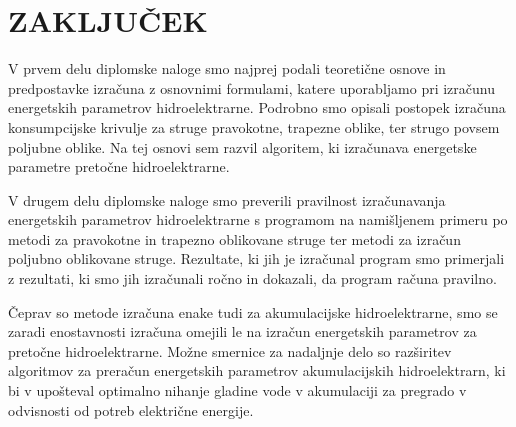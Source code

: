 
\chapter{ZAKLJUČEK}

V prvem delu diplomske naloge smo najprej podali teoretične osnove in predpostavke izračuna z osnovnimi formulami, katere uporabljamo pri izračunu energetskih parametrov hidroelektrarne. Podrobno smo opisali postopek izračuna konsumpcijske krivulje za struge pravokotne, trapezne oblike, ter strugo povsem poljubne oblike. Na tej osnovi sem razvil algoritem, ki izračunava energetske parametre pretočne hidroelektrarne.


V drugem delu diplomske naloge smo preverili pravilnost izračunavanja energetskih parametrov hidroelektrarne s programom na namišljenem primeru po metodi za pravokotne in trapezno oblikovane struge ter metodi za izračun poljubno oblikovane struge. Rezultate, ki jih je izračunal program smo primerjali z rezultati, ki smo jih izračunali ročno in dokazali, da program računa pravilno.

 Čeprav so metode izračuna enake tudi za akumulacijske hidroelektrarne, smo se zaradi enostavnosti izračuna omejili le na izračun energetskih parametrov za pretočne hidroelektrarne. Možne smernice za nadaljnje delo so razširitev algoritmov za preračun energetskih parametrov akumulacijskih hidroelektrarn, ki bi v upošteval optimalno nihanje gladine vode v akumulaciji za pregrado v odvisnosti od potreb električne energije.



